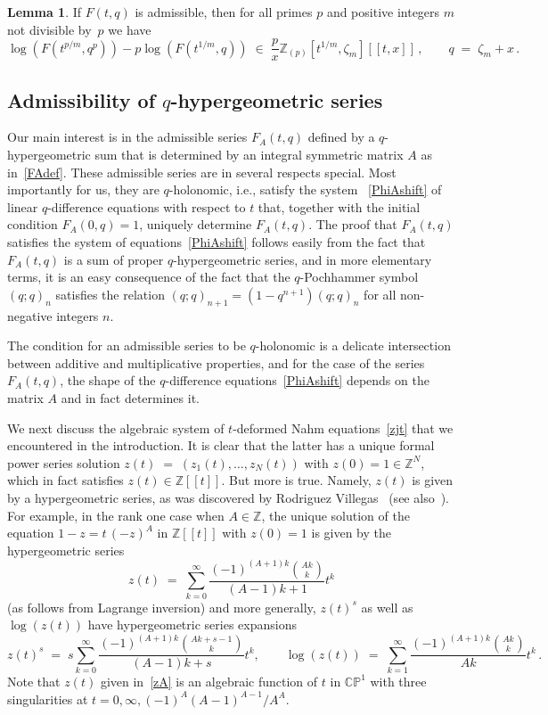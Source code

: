 \documentclass[12pt,reqno]{amsart}
\theoremstyle{definition}
\newtheorem{lemma}[proposition]{Lemma}
\def\BZ{\mathbb Z}
\def\BC{\mathbb C}
\def\BP{\mathbb P}
\def\be{\begin{equation}}
\def\ee{\end{equation}}
\def\z{\zeta}
\def\={\;=\;}
\def\inn{\;\in\;}
\begin{document}
\begin{lemma}
\label{lem.dwork.admis}
If $F(t,q)$ is admissible, then for all primes $p$ and positive integers $m$ not
divisible by~$p$ we have
\be
\label{dphiA1}
\log(F(t^{p/m},q^p)) -p\log(F(t^{1/m},q))
\inn \frac{p}{x} \BZ_{(p)}[t^{1/m},\z_{m}][\![t,x]\!]\,,
\qquad q\=\z_{m}+x\,.
\ee
\end{lemma}

\subsection{\texorpdfstring{Admissibility of
    $q$-hypergeometric series}{Admissibility of q-hypergeometric series}}
\label{sub.DT}

Our main interest is in the admissible series $F_A(t,q)$ defined by a
$q$-hypergeometric sum that is determined by an integral symmetric matrix $A$
as in~\eqref{FAdef}. These admissible series are in several respects special.
Most importantly for us, they are $q$-holonomic, i.e., satisfy the system
~\eqref{PhiAshift} of linear $q$-difference equations with respect to $t$ that,
together with the initial condition $F_A(0,q)=1$, uniquely determine $F_A(t,q)$.
The proof that $F_A(t,q)$ satisfies the system of equations~\eqref{PhiAshift}
follows easily from the fact that $F_A(t,q)$ is a sum of proper $q$-hypergeometric
series, and in more elementary terms, it is an easy consequence of the fact that
the $q$-Pochhammer symbol $(q;q)_n$ satisfies the relation
$(q;q)_{n+1}=(1-q^{n+1})(q;q)_n$ for all non-negative integers $n$. 

The condition for an admissible series to be $q$-holonomic is a delicate
intersection between additive and multiplicative properties, and for the case of
the series $F_A(t,q)$, the shape of the $q$-difference equations~\eqref{PhiAshift}
depends on the matrix $A$ and in fact determines it.

We next discuss the algebraic system of $t$-deformed Nahm equations~\eqref{zjt}
that we encountered in the introduction. It is clear that the latter has a
unique formal power series solution $z(t)\=(z_1(t),\dots,z_N(t))$ with
$z(0)=1 \in \BZ^N$, which in fact satisfies $z(t) \in \BZ[\![t]\!]$. But more is
true. Namely, $z(t)$ is given by a hypergeometric series, as was discovered by
Rodriguez Villegas~\cite[Sec. 4.1]{RV:Apoly} (see also~\cite[Sec. 7]{Z:diffeq}).
For example, in the rank one case
when $A \in \BZ$, the unique solution of the equation $1-z=t\,(-z)^A$ in
$\BZ[\![t]\!]$ with $z(0)=1$ is given by the hypergeometric
series~\cite[Eqn.(3.0.8)]{RV:Apoly}
\be
\label{zA}
z(t) \= \sum_{k=0}^{\infty} \frac{(-1)^{(A+1)k}\binom{Ak}{k}}{(A-1)k+1} t^k 
\ee
(as follows from Lagrange inversion) and more generally, $z(t)^s$ as well as
$\log(z(t))$ have hypergeometric series expansions~\cite[p.5]{RV:Apoly}
\be
\label{zAs}
z(t)^s \= s \sum_{k=0}^{\infty} 
\frac{(-1)^{(A+1)k}\binom{Ak+s-1}{k}}{(A-1)k+s}t^k, \qquad
\log(z(t)) \= \sum_{k=1}^{\infty} \frac{(-1)^{(A+1)k}\binom{Ak}{k}}{Ak} t^k
\,.
\ee
Note that $z(t)$ given in~\eqref{zA} is an algebraic function of $t$ in $\BC\BP^1$
with three singularities at $t=0,\infty, (-1)^A(A-1)^{A-1}/A^A$.
\end{document}
